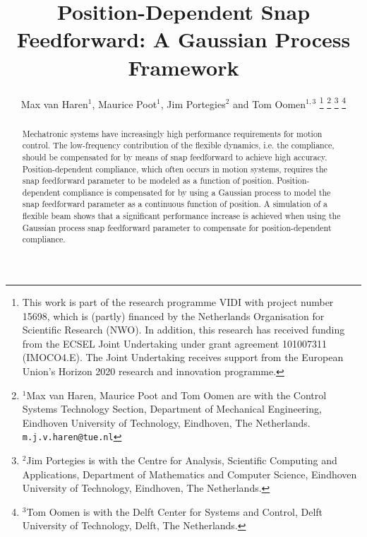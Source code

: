 \documentclass[letterpaper, 10 pt, conference]{ieeeconf}  %
\title{\LARGE \bf
Position-Dependent Snap Feedforward: A Gaussian Process Framework
}
\author{Max van Haren$^{1}$, Maurice Poot$^{1}$, Jim Portegies$^{2}$ and Tom Oomen$^{1,3}$%
\thanks{This work is part of the research programme VIDI with project number 15698, which is (partly) financed by the Netherlands Organisation for Scientific Research (NWO). In addition, this research has received funding from the ECSEL Joint Undertaking under grant agreement 101007311 (IMOCO4.E). The Joint Undertaking receives support from the European Union’s Horizon 2020 research and innovation programme.}%
\thanks{$^{1}$Max van Haren, Maurice Poot and Tom Oomen are with the Control Systems Technology Section, Department of Mechanical Engineering, Eindhoven University of Technology, Eindhoven, The Netherlands.
        {\tt\small m.j.v.haren@tue.nl}}%
\thanks{$^{2}$Jim Portegies is with the Centre for Analysis, Scientific Computing and Applications, Department of Mathematics and Computer Science, Eindhoven University of Technology, Eindhoven, The Netherlands.}
\thanks{$^{3}$Tom Oomen is with the Delft Center for Systems and Control, Delft University of Technology, Delft, The Netherlands.}}
\begin{document}
\maketitle
\thispagestyle{empty}
\pagestyle{empty}
\begin{abstract}
	Mechatronic systems have increasingly high performance requirements for motion control. The low-frequency contribution of the flexible dynamics, i.e. the compliance, should be compensated for by means of snap feedforward to achieve high accuracy. Position-dependent compliance, which often occurs in motion systems, requires the snap feedforward parameter to be modeled as a function of position. Position-dependent compliance is compensated for by using a Gaussian process to model the snap feedforward parameter as a continuous function of position. A simulation of a flexible beam shows that a significant performance increase is achieved when using the Gaussian process snap feedforward parameter to compensate for position-dependent compliance.
\end{abstract}

\end{document}

